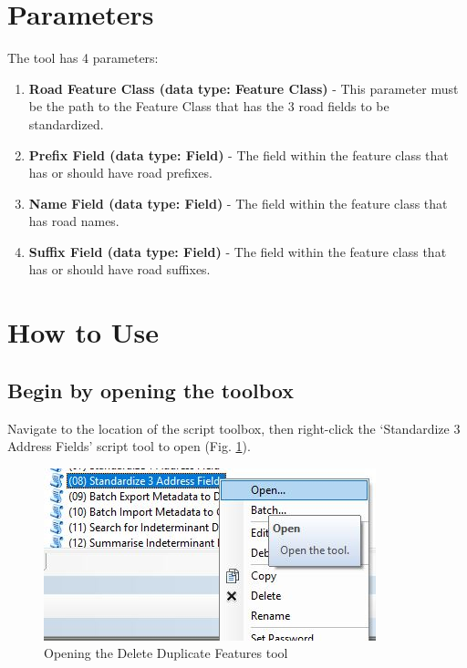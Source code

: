 \documentclass[openany]{book}
\theoremstyle{definition}
\theoremstyle{definition}
\theoremstyle{definition}
\theoremstyle{remark}
\begin{document}
\section{Parameters}\label{parameters-6}

The tool has 4 parameters:

\begin{enumerate}
\def\labelenumi{\arabic{enumi}.}
\item
  \textbf{Road Feature Class (data type: Feature Class)} - This
  parameter must be the path to the Feature Class that has the 3 road
  fields to be standardized.
\item
  \textbf{Prefix Field (data type: Field)} - The field within the
  feature class that has or should have road prefixes.
\item
  \textbf{Name Field (data type: Field)} - The field within the feature
  class that has road names.
\item
  \textbf{Suffix Field (data type: Field)} - The field within the
  feature class that has or should have road suffixes.
\end{enumerate}

\section{How to Use}\label{how-to-use-6}

\subsection{Begin by opening the
toolbox}\label{begin-by-opening-the-toolbox-6}

Navigate to the location of the script toolbox, then right-click the
`Standardize 3 Address Fields' script tool to open (Fig.
\ref{fig:std3open}).

\begin{figure}[H]

{\centering \includegraphics{figures/std3-open} 

}

\caption{Opening the Delete Duplicate Features tool}\label{fig:std3open}
\end{figure}
\end{document}
